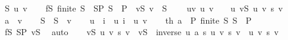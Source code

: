 \begin{isabellebody}
\ S\ u\ v\isanewline
\ \ \isamarkupfalse%
\ fS{\isacharcolon}{\kern0pt}\ {\isachardoublequoteopen}finite\ S{\isachardoublequoteclose}\ \ SP{\isacharcolon}{\kern0pt}\ {\isachardoublequoteopen}S\ {\isasymsubseteq}\ P{\isachardoublequoteclose}\ \ vS{\isacharcolon}{\kern0pt}\ {\isachardoublequoteopen}v\ {\isasymin}\ S{\isachardoublequoteclose}\isanewline
\ \ \ \ uv{\isacharcolon}{\kern0pt}\ {\isachardoublequoteopen}u\ v\ {\isasymnoteq}\ {}{\isachardoublequoteclose}\ \ u{\isacharcolon}{\kern0pt}\ {\isachardoublequoteopen}{\isacharparenleft}{\kern0pt}{\isasymSum}v{\isasymin}S{\isachardot}{\kern0pt}\ u\ v\ {\isacharasterisk}{\kern0pt}s\ v{\isacharparenright}{\kern0pt}\ {\isacharequal}{\kern0pt}\ {}{\isachardoublequoteclose}\isanewline
\ \ \isamarkupfalse%
\ {\isacharquery}{\kern0pt}a\ {\isacharequal}{\kern0pt}\ v\isanewline
\ \ \isamarkupfalse%
\ {\isacharquery}{\kern0pt}S\ {\isacharequal}{\kern0pt}\ {\isachardoublequoteopen}S\ {\isacharminus}{\kern0pt}\ {\isacharbraceleft}{\kern0pt}v{\isacharbraceright}{\kern0pt}{\isachardoublequoteclose}\isanewline
\ \ \isamarkupfalse%
\ {\isacharquery}{\kern0pt}u\ {\isacharequal}{\kern0pt}\ {\isachardoublequoteopen}{\isasymlambda}i{\isachardot}{\kern0pt}\ {\isacharparenleft}{\kern0pt}{\isacharminus}{\kern0pt}\ u\ i{\isacharparenright}{\kern0pt}\ {\isacharslash}{\kern0pt}\ u\ v{\isachardoublequoteclose}\isanewline
\ \ \isamarkupfalse%
\ th{}{\isacharcolon}{\kern0pt}\ {\isachardoublequoteopen}{\isacharquery}{\kern0pt}a\ {\isasymin}\ P{\isachardoublequoteclose}\ {\isachardoublequoteopen}finite\ {\isacharquery}{\kern0pt}S{\isachardoublequoteclose}\ {\isachardoublequoteopen}{\isacharquery}{\kern0pt}S\ {\isasymsubseteq}\ P{\isachardoublequoteclose}\isanewline
\ \ \ \ \isamarkupfalse%
\ fS\ SP\ vS\ \isamarkupfalse%
\ auto\isanewline
\ \ \isamarkupfalse%
\ {\isachardoublequoteopen}{\isacharparenleft}{\kern0pt}{\isasymSum}v{\isasymin}{\isacharquery}{\kern0pt}S{\isachardot}{\kern0pt}\ {\isacharquery}{\kern0pt}u\ v\ {\isacharasterisk}{\kern0pt}s\ v{\isacharparenright}{\kern0pt}\ {\isacharequal}{\kern0pt}\ {\isacharparenleft}{\kern0pt}{\isasymSum}v{\isasymin}S{\isachardot}{\kern0pt}\ {\isacharparenleft}{\kern0pt}{\isacharminus}{\kern0pt}\ {\isacharparenleft}{\kern0pt}inverse\ {\isacharparenleft}{\kern0pt}u\ {\isacharquery}{\kern0pt}a{\isacharparenright}{\kern0pt}{\isacharparenright}{\kern0pt}{\isacharparenright}{\kern0pt}\ {\isacharasterisk}{\kern0pt}s\ {\isacharparenleft}{\kern0pt}u\ v\ {\isacharasterisk}{\kern0pt}s\ v{\isacharparenright}{\kern0pt}{\isacharparenright}{\kern0pt}\ {\isacharminus}{\kern0pt}\ {\isacharquery}{\kern0pt}u\ v\ {\isacharasterisk}{\kern0pt}s\ v{\isachardoublequoteclose}\isanewline

\end{isabellebody}
